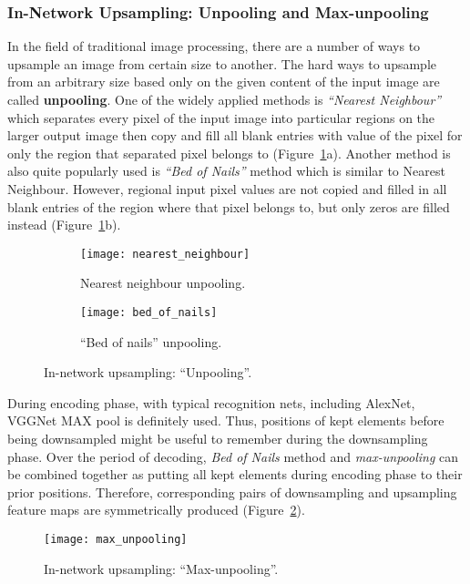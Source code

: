 \subsubsection{In-Network Upsampling: Unpooling and Max-unpooling}
In the field of traditional image processing, there are a number of ways to
upsample an image from certain size to another. The hard ways to upsample from
an arbitrary size based only on the given content of the input image are called
\textbf{unpooling}. One of the widely applied methods is \emph{``Nearest
Neighbour''} which separates every pixel of the input image into particular
regions on the larger output image then copy and fill all blank entries with
value of the pixel for only the region that separated pixel belongs to
(Figure~\ref{fig:unpooling}a). Another method is also quite
popularly used is \emph{``Bed of Nails''} method which is similar to Nearest
Neighbour. However, regional input pixel values are not copied and filled in all
blank entries of the region where that pixel belongs to, but only zeros are
filled instead (Figure~\ref{fig:unpooling}b).
\begin{figure}[h]
    \centering
    \begin{subfigure}[b]{0.495\linewidth}
        \texttt{[image: nearest\_neighbour]}
        \caption{Nearest neighbour unpooling.}
    \end{subfigure}
    \begin{subfigure}[b]{0.495\linewidth}
        \texttt{[image: bed\_of\_nails]}
        \caption{``Bed of nails'' unpooling.}
    \end{subfigure}
    \caption{In-network upsampling: ``Unpooling''.}
    \label{fig:unpooling}
\end{figure}


During encoding phase, with typical recognition nets, including AlexNet, VGGNet
MAX \acrshort{pool} is definitely used. Thus, positions of kept elements before
being downsampled might be useful to remember during the downsampling phase.
Over the period of decoding, \emph{Bed of Nails} method and \emph{max-unpooling}
can be combined together as putting all kept elements during encoding phase to
their prior positions. Therefore, corresponding pairs of downsampling and
upsampling feature maps are symmetrically produced
(Figure~\ref{fig:max-unpooling}).
\begin{figure}[h]
    \centering
    \texttt{[image: max\_unpooling]}
    \caption{In-network upsampling: ``Max-unpooling''.}
    \label{fig:max-unpooling}
\end{figure}


